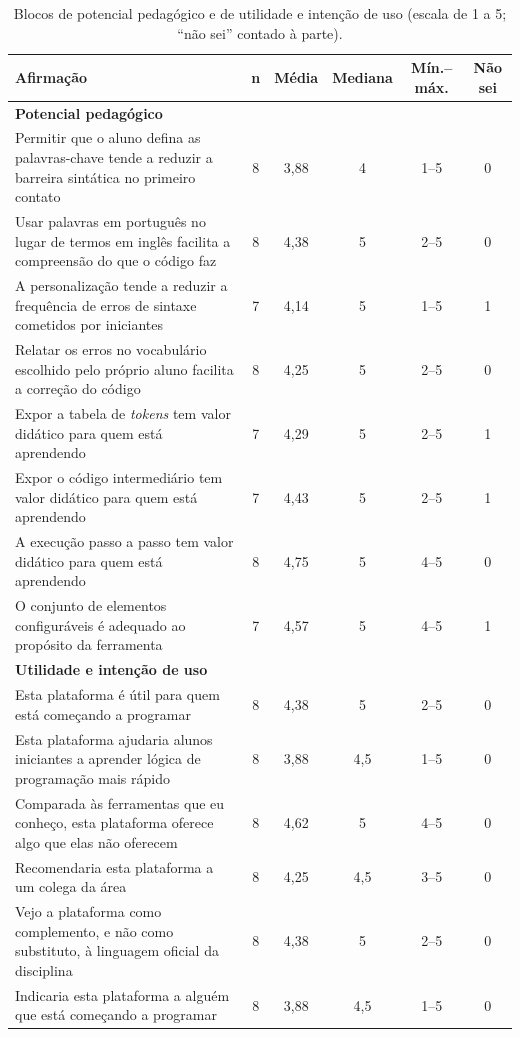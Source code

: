 \begin{table}[htbp]
\centering
\caption{Blocos de potencial pedagógico e de utilidade e intenção de uso (escala de 1 a 5; ``não sei'' contado à parte).}
\label{tab:resultado-pedagogico}
\footnotesize
\renewcommand{\arraystretch}{1.2}
\begin{tabular}{|p{8.1cm}|c|c|c|c|c|}
\hline
\textbf{Afirmação} & \textbf{n} & \textbf{Média} & \textbf{Mediana} & \textbf{Mín.--máx.} & \textbf{Não sei} \\\hline
\multicolumn{6}{|l|}{\textbf{Potencial pedagógico}} \\\hline
Permitir que o aluno defina as palavras-chave tende a reduzir a barreira sintática no primeiro contato & 8 & 3,88 & 4 & 1--5 & 0 \\\hline
Usar palavras em português no lugar de termos em inglês facilita a compreensão do que o código faz & 8 & 4,38 & 5 & 2--5 & 0 \\\hline
A personalização tende a reduzir a frequência de erros de sintaxe cometidos por iniciantes & 7 & 4,14 & 5 & 1--5 & 1 \\\hline
Relatar os erros no vocabulário escolhido pelo próprio aluno facilita a correção do código & 8 & 4,25 & 5 & 2--5 & 0 \\\hline
Expor a tabela de \textit{tokens} tem valor didático para quem está aprendendo & 7 & 4,29 & 5 & 2--5 & 1 \\\hline
Expor o código intermediário tem valor didático para quem está aprendendo & 7 & 4,43 & 5 & 2--5 & 1 \\\hline
A execução passo a passo tem valor didático para quem está aprendendo & 8 & 4,75 & 5 & 4--5 & 0 \\\hline
O conjunto de elementos configuráveis é adequado ao propósito da ferramenta & 7 & 4,57 & 5 & 4--5 & 1 \\\hline
\multicolumn{6}{|l|}{\textbf{Utilidade e intenção de uso}} \\\hline
Esta plataforma é útil para quem está começando a programar & 8 & 4,38 & 5 & 2--5 & 0 \\\hline
Esta plataforma ajudaria alunos iniciantes a aprender lógica de programação mais rápido & 8 & 3,88 & 4,5 & 1--5 & 0 \\\hline
Comparada às ferramentas que eu conheço, esta plataforma oferece algo que elas não oferecem & 8 & 4,62 & 5 & 4--5 & 0 \\\hline
Recomendaria esta plataforma a um colega da área & 8 & 4,25 & 4,5 & 3--5 & 0 \\\hline
Vejo a plataforma como complemento, e não como substituto, à linguagem oficial da disciplina & 8 & 4,38 & 5 & 2--5 & 0 \\\hline
Indicaria esta plataforma a alguém que está começando a programar & 8 & 3,88 & 4,5 & 1--5 & 0 \\\hline
\end{tabular}
\end{table}

